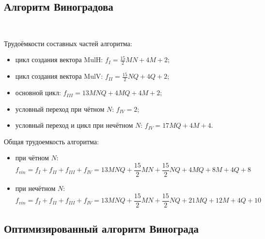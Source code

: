 \documentclass[12pt]{report}
\begin{document}
	\subsection{Алгоритм Виноградова}
	
	~\
	
	Трудоёмкости составных частей алгоритма:
	\begin{itemize}
		\item цикл создания вектора MulH: $f_{I} = \frac{15}{2}MN + 4M + 2$;
		\item цикл создания вектора MulV:  $f_{II} = \frac{15}{2}NQ + 4Q + 2$;
		\item основной цикл: $f_{III} = 13MNQ + 4MQ + 4M + 2$;
		\item условный переход при чётном $N$: $f_{IV} = 2$;
		\item условный переход и цикл при нечётном $N$: $f_{IV} = 17MQ + 4M + 4$.
	\end{itemize}
	Общая трудоемкость алгоритма:
	\begin{itemize}
		\item при чётном $N$:
		\begin{equation}
		\label{complex_vin_even1}
		f_{vin} = f_{I} + f_{II} + f_{III} + f_{IV} = 13MNQ + \frac{15}{2}MN + \frac{15}{2}NQ + 4MQ + 8M + 4Q + 8
		\end{equation}
		\item при нечётном $N$:
		\begin{equation}
		\label{complex_vin_odd1}
		f_{vin} = f_{I} + f_{II} + f_{III} + f_{IV} = 13MNQ + \frac{15}{2}MN + \frac{15}{2}NQ + 21MQ + 12M + 4Q + 10
		\end{equation}
	\end{itemize}
	
	\subsection{Оптимизированный алгоритм Винограда}
	
	~\
	
\end{document}
